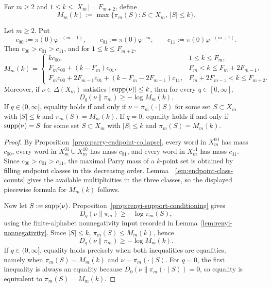\begin{definition}\label{def:parry-support-envelope}
For \(m\ge2\) and \(1\le k\le |X_m|=F_{m+2}\), define
\[
M_m(k):=
\max\{\pi_m(S): S\subset X_m,\ |S|\le k\}.
\]
\end{definition}

\begin{theorem}\label{thm:parry-support-barrier}
Let \(m\ge2\). Put
\[
c_{00}:=\pi(0)\varphi^{-(m-1)},\qquad
c_{01}:=\pi(0)\varphi^{-m},\qquad
c_{11}:=\pi(0)\varphi^{-(m+1)}.
\]
Then \(c_{00}>c_{01}>c_{11}\), and for \(1\le k\le F_{m+2}\),
\[
M_m(k)=
\begin{cases}
kc_{00}, & 1\le k\le F_m,\\[0.3em]
F_m c_{00}+(k-F_m)c_{01},
& F_m<k\le F_m+2F_{m-1},\\[0.3em]
F_m c_{00}+2F_{m-1}c_{01}
+(k-F_m-2F_{m-1})c_{11},
& F_m+2F_{m-1}<k\le F_{m+2}.
\end{cases}
\]
Moreover, if \(\nu\in\Delta(X_m)\) satisfies \(|\operatorname{supp}(\nu)|\le k\), then for
every \(q\in[0,\infty]\),
\[
D_q(\nu\|\pi_m)\ge -\log M_m(k).
\]
If \(q\in(0,\infty]\), equality holds if and only if
\(\nu=\pi_m(\cdot\mid S)\) for some set \(S\subset X_m\) with \(|S|\le k\)
and \(\pi_m(S)=M_m(k)\). If \(q=0\), equality holds if and only if
\(\operatorname{supp}(\nu)=S\) for some set \(S\subset X_m\) with \(|S|\le k\) and
\(\pi_m(S)=M_m(k)\).
\end{theorem}

\begin{proof}
By Proposition~\ref{prop:parry-endpoint-collapse}, every word in \(X_m^{00}\)
has mass \(c_{00}\), every word in \(X_m^{01}\cup X_m^{10}\) has mass
\(c_{01}\), and every word in \(X_m^{11}\) has mass \(c_{11}\). Since
\(c_{00}>c_{01}>c_{11}\), the maximal Parry mass of a \(k\)-point set is
obtained by filling endpoint classes in this decreasing order. Lemma
~\ref{lem:endpoint-class-counts} gives the available multiplicities in the
three classes, so the displayed piecewise formula for \(M_m(k)\) follows.

Now let \(S:=\operatorname{supp}(\nu)\). Proposition~\ref{prop:renyi-support-conditioning}
gives
\[
D_q(\nu\|\pi_m)\ge -\log\pi_m(S),
\]
using the finite-alphabet nonnegativity input recorded in
Lemma~\ref{lem:renyi-nonnegativity}. Since \(|S|\le k\), \(\pi_m(S)\le
M_m(k)\), hence
\[
D_q(\nu\|\pi_m)\ge -\log M_m(k).
\]
If \(q\in(0,\infty]\), equality holds precisely when both inequalities are
equalities, namely when \(\pi_m(S)=M_m(k)\) and
\(\nu=\pi_m(\cdot\mid S)\). For \(q=0\), the first inequality is always an
equality because \(D_0(\nu\|\pi_m(\cdot\mid S))=0\), so equality is
equivalent to \(\pi_m(S)=M_m(k)\).
\end{proof}

